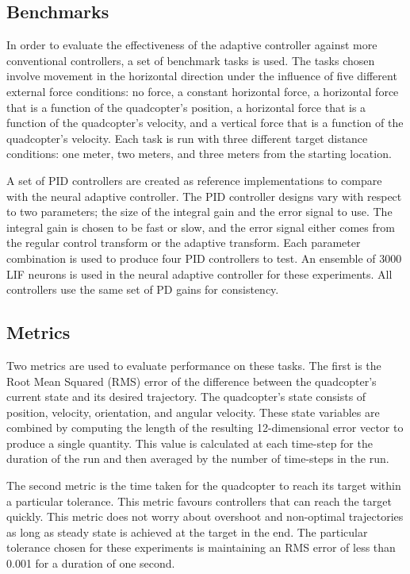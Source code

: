 \documentclass[letterpaper, 10 pt, conference]{ieeeconf}  %
\begin{document}
\subsection{Benchmarks}

In order to evaluate the effectiveness of the adaptive controller against more conventional controllers, a set of benchmark tasks is used.
The tasks chosen involve movement in the horizontal direction under the influence of five different external force conditions: no force, a constant horizontal force, a horizontal force that is a function of the quadcopter's position, a horizontal force that is a function of the quadcopter's velocity, and a vertical force that is a function of the quadcopter's velocity.
Each task is run with three different target distance conditions: one meter, two meters, and three meters from the starting location.

A set of PID controllers are created as reference implementations to compare with the neural adaptive controller.
The PID controller designs vary with respect to two parameters; the size of the integral gain and the error signal to use.
The integral gain is chosen to be fast or slow, and the error signal either comes from the regular control transform or the adaptive transform.
Each parameter combination is used to produce four PID controllers to test. 
An ensemble of 3000 LIF neurons is used in the neural adaptive controller for these experiments.
All controllers use the same set of PD gains for consistency.

\subsection{Metrics}

Two metrics are used to evaluate performance on these tasks. 
The first is the Root Mean Squared (RMS) error of the difference between the quadcopter's current state and its desired trajectory.
The quadcopter's state consists of position, velocity, orientation, and angular velocity.
These state variables are combined by computing the length of the resulting 12-dimensional error vector to produce a single quantity.
This value is calculated at each time-step for the duration of the run and then averaged by the number of time-steps in the run.

The second metric is the time taken for the quadcopter to reach its target within a particular tolerance. 
This metric favours controllers that can reach the target quickly.
This metric does not worry about overshoot and non-optimal trajectories as long as steady state is achieved at the target in the end.
The particular tolerance chosen for these experiments is maintaining an RMS error of less than 0.001 for a duration of one second.
\end{document}
